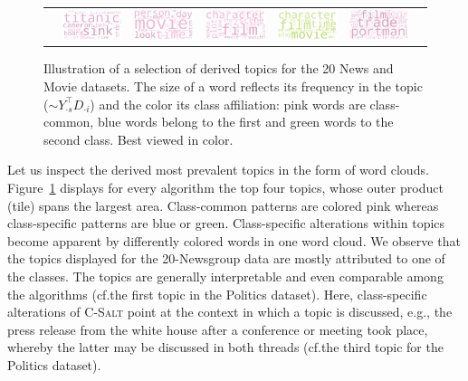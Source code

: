 \begin{figure}[!t]
\begin{tabular}{ccc@{\hskip 0.1in}cc@{\hskip 0.1in}cc}
    & \includegraphics[width=0.14\columnwidth]{pics/Wordclouds/MoviePunk_3}
    &  \includegraphics[width=0.14\columnwidth]{pics/Wordclouds/MoviePrimp_3}
    & \includegraphics[width=0.14\columnwidth]{pics/Wordclouds/MoviePrimp_4}
    &  \includegraphics[width=0.14\columnwidth]{pics/Wordclouds/MovieDBSSL_3}
    &  \includegraphics[width=0.14\columnwidth]{pics/Wordclouds/MovieDBSSL_4}
  \end{tabular}
  \caption{Illustration of a selection of derived topics for the 20 News and Movie datasets. The size of a word reflects its frequency in the topic ($\sim Y_{\cdot s}^\top D_{\cdot i}$) and the color its class affiliation: pink words are class-common, blue words belong to the first and green words to the second class. Best viewed in color.\label{fig:CS:topics}}
\end{figure}
Let us inspect the derived most prevalent topics in the form of word clouds.
Figure~\ref{fig:CS:topics} displays for every algorithm the top four topics, whose outer product (tile) spans the largest area. Class-common patterns are colored pink whereas class-specific patterns are blue or green. Class-specific alterations within topics become apparent by differently colored words in one word cloud. We observe that the topics displayed for the 20-Newsgroup data are mostly attributed to one of the classes. The topics are generally interpretable and even comparable among the algorithms (cf.\@ the first topic in the Politics dataset). Here, class-specific alterations of \textsc{C-Salt} point at the context in which a topic is discussed, e.g., the press release from the white house after a conference or meeting took place, whereby the latter may be discussed in both threads (cf.\@ the third topic for the Politics dataset).

